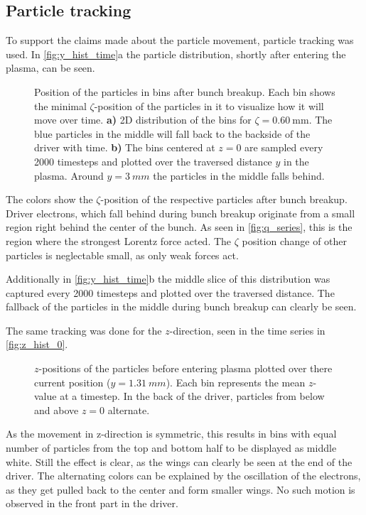 \documentclass[bachelor_thesis]{subfiles}
\begin{document}
\subsection{Particle tracking}
To support the claims made about the particle movement, particle tracking was used. In \autoref{fig:y_hist_time}a the particle distribution, shortly after entering the plasma, can be seen.
\begin{figure}
	\centering
	
	\caption{Position of the particles in bins after bunch breakup. Each bin shows the minimal $\zeta$-position of the particles in it to visualize how it will move over time.
	\textbf{a)} 2D distribution of the bins for $\zeta=\qty{0.60}{\mm}$. The blue particles in the middle will fall back to the backside of the driver with time.
	\textbf{b)} The bins centered at $z=0$ are sampled every 2000 timesteps and plotted over the traversed distance $y$ in the plasma. Around $y=\qty{3}{mm}$ the particles in the middle falls behind.}
	\label{fig:y_hist_time}
\end{figure}
The colors show the $\zeta$-position of the respective particles after bunch breakup. Driver electrons, which fall behind during bunch breakup originate from a small region right behind the center of the bunch. 
As seen in \autoref{fig:q_series}, this is the region where the strongest Lorentz force acted.
The $\zeta$ position change of other particles is neglectable small, as only weak forces act.

Additionally in \autoref{fig:y_hist_time}b the middle slice of this distribution was captured every 2000 timesteps and plotted over the traversed distance. The fallback of the particles in the middle during bunch breakup can clearly be seen.

The same tracking was done for the $z$-direction, seen in the time series in \autoref{fig:z_hist_0}.
\begin{figure}
	\centering
	
	\caption{$z$-positions of the particles before entering plasma plotted over there current position ($y=\qty{1.31}{mm}$). Each bin represents the mean $z$-value at a timestep. In the back of the driver, 
	particles from below and above $z=0$ alternate. }
	\label{fig:z_hist_0}
\end{figure}
As the movement in z-direction is symmetric, this results in bins with equal number of particles from the top and bottom half to be displayed as middle white. Still the effect is clear, as the wings can clearly be seen at the end of the driver.
The alternating colors can be explained by the oscillation of the electrons, as they get pulled back to the center and form smaller wings. No such motion is observed in the front part in the driver.
\end{document}
